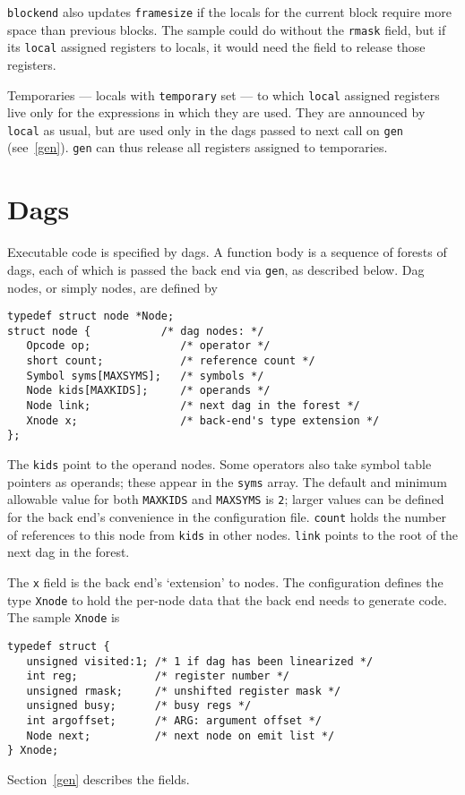\noindent
\verb|blockend| also updates \verb|framesize| if the locals for the current
block require more space than previous blocks.
The sample could do without the \verb|rmask| field, but
if its \verb|local| assigned registers to locals, it would need
the field to release those registers.

Temporaries --- locals with \verb|temporary| set --- to which
\verb|local| assigned registers live only for the expressions in which
they are used.  They are announced by \verb|local| as usual, but are
used only in the dags passed to next call on \verb|gen|
(see~\ref{gen}).  \verb|gen| can thus release all registers assigned to
temporaries.


\section{Dags}

\label{dags}
Executable code is specified by dags.  A function body is a sequence of
forests of dags, each of which is passed the back end via \verb|gen|,
as described below.  Dag nodes, or simply nodes, are defined by
\begin{verbatim}
typedef struct node *Node;
struct node {           /* dag nodes: */
   Opcode op;              /* operator */
   short count;            /* reference count */
   Symbol syms[MAXSYMS];   /* symbols */
   Node kids[MAXKIDS];     /* operands */
   Node link;              /* next dag in the forest */
   Xnode x;                /* back-end's type extension */
};
\end{verbatim}

The \verb|kids| point to the operand nodes.  Some operators also
take symbol table pointers as operands; these appear in the \verb|syms|
array.  The default and minimum allowable value for both \verb|MAXKIDS|
and \verb|MAXSYMS| is \verb|2|; larger values can be defined for the
back end's convenience in the configuration file. \verb|count|
holds the number of references to this node from \verb|kids| in other
nodes. \verb|link| points to the root of the next dag in the forest.

The \verb|x| field is the back end's `extension' to nodes.  The
configuration defines the type \verb|Xnode| to hold the per-node data
that the back end needs to generate code.  The sample \verb|Xnode| is
\begin{verbatim}
typedef struct {
   unsigned visited:1; /* 1 if dag has been linearized */
   int reg;            /* register number */
   unsigned rmask;     /* unshifted register mask */
   unsigned busy;      /* busy regs */
   int argoffset;      /* ARG: argument offset */
   Node next;          /* next node on emit list */
} Xnode;
\end{verbatim}
Section~\ref{gen} describes the fields.

